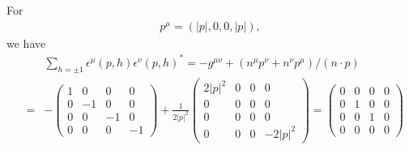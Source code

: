 \documentclass[11pt]{article}
\def\eps{\epsilon}
\begin{document}
\section{ }
For 
\begin{eqnarray}
    p^\mu = (|p|, 0, 0, |p|),
\end{eqnarray}
we have
\begin{eqnarray}
    &&\sum_{h=\pm 1} \eps^\mu(p,h) \eps^\nu(p,h)^*
      = -g^{\mu\nu} + (n^\mu p^\nu + n^\nu p^\mu)/(n\cdot p) \\
    &=&-
    \begin{pmatrix}
        1 & 0 & 0 & 0 \\
        0 & -1& 0 & 0 \\
        0 & 0 & -1& 0 \\
        0 & 0 & 0 & -1
    \end{pmatrix}
    +\frac{1}{2|p|^2}
    \begin{pmatrix}
        2|p|^2 & 0 & 0 & 0 \\
        0 & 0 & 0 & 0 \\
        0 & 0 & 0 & 0 \\
        0 & 0 & 0 & -2|p|^2
    \end{pmatrix}
    =
    \begin{pmatrix}
        0 & 0 & 0 & 0 \\
        0 & 1 & 0 & 0 \\
        0 & 0 & 1 & 0 \\
        0 & 0 & 0 & 0
    \end{pmatrix}
\end{eqnarray}
\end{document}
